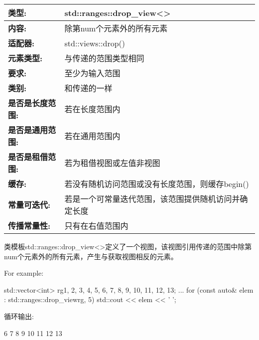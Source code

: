 \begin{longtable}[c]{|l|l|}
\hline
\textbf{类型:}                 & std::ranges::drop\_view\textless{}\textgreater{} \\ \hline
\endfirsthead
%
\endhead
%
\textbf{内容:}              & 除第num个元素外的所有元素      \\ \hline
\textbf{适配器:}              & std::views::drop()                               \\ \hline
\textbf{元素类型:}         & 与传递的范围类型相同                       \\ \hline
\textbf{要求:}             & 至少为输入范围                             \\ \hline
\textbf{类别:}             & 和传递的一样                                   \\ \hline
\textbf{是否是长度范围:}       & 若在长度范围内                              \\ \hline
\textbf{是否是通用范围:}      & 若在通用范围内                               \\ \hline
\textbf{是否是租借范围:} & 若为租借视图或左值非视图                           \\ \hline
\textbf{缓存:}            & 若没有随机访问范围或没有长度范围，则缓存begin()          \\ \hline
\textbf{常量可迭代:}    & 若是一个可常量迭代范围，该范围提供随机访问并确定长度 \\ \hline
\textbf{传播常量性:} & 只有在右值范围内                          \\ \hline
\end{longtable}

类模板std::ranges::drop\_view<>定义了一个视图，该视图引用传递的范围中除第num个元素外的所有元素，产生与获取视图相反的元素。

For example:

\begin{cpp}
std::vector<int> rg{1, 2, 3, 4, 5, 6, 7, 8, 9, 10, 11, 12, 13};
...
for (const auto& elem : std::ranges::drop_view{rg, 5}) {
	std::cout << elem << ' ';
}
\end{cpp}

循环输出:

\begin{shell}
6 7 8 9 10 11 12 13
\end{shell}

